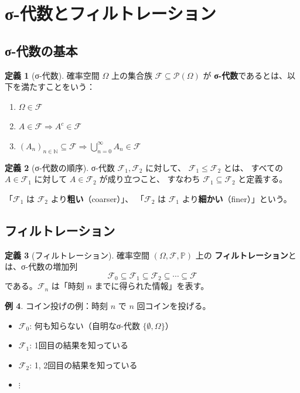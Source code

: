 \documentclass[a4paper,12pt]{ltjsarticle}
\theoremstyle{definition}
\newtheorem{definition}{定義}[section]
\newtheorem{example}[definition]{例}
\begin{document}
\section{σ-代数とフィルトレーション}

\subsection{σ-代数の基本}

\begin{definition}[σ-代数]
確率空間 $\Omega$ 上の集合族 $\mathcal{F} \subseteq \mathcal{P}(\Omega)$ が
\textbf{σ-代数}であるとは、以下を満たすことをいう：
\begin{enumerate}
  \item $\Omega \in \mathcal{F}$
  \item $A \in \mathcal{F} \Rightarrow A^c \in \mathcal{F}$
  \item $(A_n)_{n \in \mathbb{N}} \subseteq \mathcal{F}
         \Rightarrow \bigcup_{n=0}^\infty A_n \in \mathcal{F}$
\end{enumerate}
\end{definition}

\begin{definition}[σ-代数の順序]
σ-代数 $\mathcal{F}_1, \mathcal{F}_2$ に対して、
$\mathcal{F}_1 \leq \mathcal{F}_2$ とは、
すべての $A \in \mathcal{F}_1$ に対して $A \in \mathcal{F}_2$ が成り立つこと、
すなわち $\mathcal{F}_1 \subseteq \mathcal{F}_2$ と定義する。

「$\mathcal{F}_1$ は $\mathcal{F}_2$ より\textbf{粗い}（coarser）」、
「$\mathcal{F}_2$ は $\mathcal{F}_1$ より\textbf{細かい}（finer）」という。
\end{definition}

\subsection{フィルトレーション}

\begin{definition}[フィルトレーション]
確率空間 $(\Omega, \mathcal{F}, \mathbb{P})$ 上の
\textbf{フィルトレーション}とは、σ-代数の増加列
\[
  \mathcal{F}_0 \subseteq \mathcal{F}_1 \subseteq \mathcal{F}_2
  \subseteq \cdots \subseteq \mathcal{F}
\]
である。$\mathcal{F}_n$ は「時刻 $n$ までに得られた情報」を表す。
\end{definition}

\begin{example}
コイン投げの例：時刻 $n$ で $n$ 回コインを投げる。
\begin{itemize}
  \item $\mathcal{F}_0$: 何も知らない（自明なσ-代数 $\{\emptyset, \Omega\}$）
  \item $\mathcal{F}_1$: 1回目の結果を知っている
  \item $\mathcal{F}_2$: 1, 2回目の結果を知っている
  \item $\vdots$
\end{itemize}
\end{example}
\end{document}
